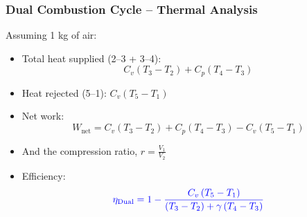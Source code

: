 \documentclass[10pt,compress]{beamer}
\begin{document}
\begin{frame}
 \frametitle{Dual Combustion Cycle --  Thermal Analysis}
   Assuming 1 kg of air: 
    \begin{itemize}
     \item <1-> Total heat supplied (2--3 + 3--4): 
      \begin{displaymath}
       C_{v}\left(T_{3}-T_{2}\right) + C_{p}\left(T_{4}-T_{3}\right)
      \end{displaymath}  
     \item <2-> Heat rejected (5--1): $C_{v}\left(T_{5}-T_{1}\right)$
     \item <3-> Net work: 
       \begin{displaymath}
         W_{\text{net}}= C_{v}\left(T_{3}-T_{2}\right) + C_{p}\left(T_{4}-T_{3}\right)-C_{v}\left(T_{5}-T_{1}\right)
        \end{displaymath}
     \item <4-> And the compression ratio, $r=\displaystyle\frac{V_{1}}{V_{2}}$
     \item <4-> Efficiency:
      \begin{displaymath}
       \textcolor{blue}{\eta_{\text{Dual}}=1- \displaystyle\frac{C_{v}\left(T_{5}-T_{1}\right)}{\left(T_{3}-T_{2}\right)+\gamma\left(T_{4}-T_{3}\right)}}
      \end{displaymath}
    \end{itemize}
\end{frame}
\end{document}
